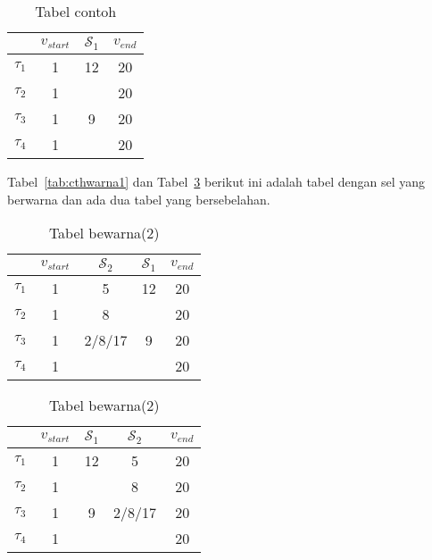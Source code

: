 \begin{table}[H] %
	\centering 
	\caption{Tabel contoh}
	\label{tab:contoh2}
	\begin{tabular}{cccc}
		\toprule
		& $v_{start}$ & $\mathcal{S}_{1}$ & $v_{end}$\\

		\midrule
		$\tau_{1}$ & 1 & 12& 20\\
		$\tau_{2}$ & 1 &  & 20\\
		$\tau_{3}$ & 1 & 9 & 20\\
		$\tau_{4}$ & 1 &  & 20\\

		\bottomrule
		
	\end{tabular} 
\end{table}
Tabel~\ref{tab:cthwarna1} dan Tabel~\ref{tab:cthwarna2} berikut ini adalah tabel dengan sel yang berwarna dan ada dua tabel yang bersebelahan. 
\begin{table}[H]
	\begin{minipage}[c]{0.49\linewidth}
		\centering
		\caption{Tabel bewarna(1)}
		\label{tab:cthwarna1}
		\begin{tabular}{ccccc}
			\toprule
			 & $v_{start}$ & $\mathcal{S}_{2}$ & $\mathcal{S}_{1}$ & $v_{end}$\\
			
			\midrule
			$\tau_{1}$ & 1 & 5 \cellcolor{green}& 12& 20\\
			$\tau_{2}$ & 1 & 8 \cellcolor{green}& & 20\\
			$\tau_{3}$ & 1 & 2/8/17 \cellcolor{green}& 9 & 20\\
			$\tau_{4}$ & 1 & \cellcolor{red}& & 20\\
			
			\bottomrule

		\end{tabular}
	\end{minipage}
	\begin{minipage}[c]{0.49\linewidth}
		
		\centering 
		\caption{Tabel bewarna(2)}
		\label{tab:cthwarna2}
		\begin{tabular}{ccccc}
			\toprule
			 & $v_{start}$ & $\mathcal{S}_{1}$ & $\mathcal{S}_{2}$ & $v_{end}$\\
			
			\midrule
			$\tau_{1}$ & 1 & 12& 5 \cellcolor{red} &20\\
			$\tau_{2}$ & 1 &  &  8 \cellcolor{green} &20\\
			$\tau_{3}$ & 1 & 9 & 2/8/17 \cellcolor{green} &20\\
			$\tau_{4}$ & 1 &   & \cellcolor{red} &20\\
			
			\bottomrule
		
		\end{tabular}
	\end{minipage}
\end{table}

